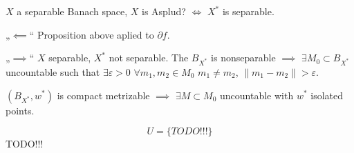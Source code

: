 \documentclass[12pt]{article}					%
\begin{document}
\begin{veta}
	$X$ a separable Banach space, $X$ is Asplud? $\Leftrightarrow$ $X^*$ is separable.

	\begin{dukazin}
		„$\impliedby$“ Proposition above aplied to $\partial f$.

		„$\implies$“ $X$ separable, $X^*$ not separable. The $B_{X^*}$ is nonseparable $\implies$ $\exists M_0 \subset B_{X^*}$ uncountable such that $\exists ε > 0$ $\forall m_1, m_2 \in M_0$ $m_1 ≠ m_2$, $\|m_1 - m_2\| > ε$.

		$(B_{X^*}, w^*)$ is compact metrizable $\implies$ $\exists M \subset M_0$ uncountable with $w^*$ isolated points.

		$$ U = \{TODO!!!\} $$
		TODO!!! %
	\end{dukazin}
\end{veta}
\end{document}
